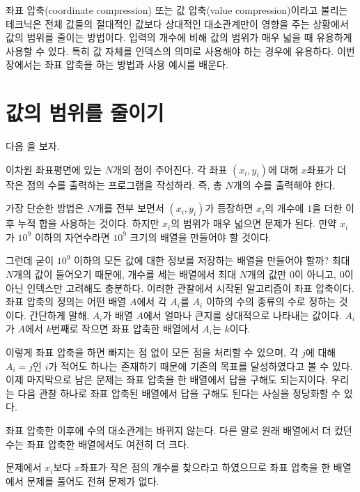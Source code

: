 좌표 압축(coordinate compression) 또는 값 압축(value compression)이라고 불리는 테크닉은 전체 값들의 절대적인 값보다 상대적인 대소관계만이 영향을 주는 상황에서 값의 범위를 줄이는 방법이다. 입력의 개수에 비해 값의 범위가 매우 넓을 때 유용하게 사용할 수 있다. 특히 값 자체를 인덱스의 의미로 사용해야 하는 경우에 유용하다. 이번 장에서는 좌표 압축을 하는 방법과 사용 예시를 배운다.

\section{값의 범위를 줄이기}
다음 을 보자.
\begin{example} \label{ex: value-compression}
    이차원 좌표평면에 있는 $N$개의 점이 주어진다. 각 좌표 $(x_i, y_i)$에 대해 $x$좌표가 더 작은 점의 수를 출력하는 프로그램을 작성하라. 즉, 총 $N$개의 수를 출력해야 한다.
\end{example}

가장 단순한 방법은 $N$개를 전부 보면서 $(x_i, y_i)$가 등장하면 $x_i$의 개수에 $1$을 더한 이후 누적 합을 사용하는 것이다. 하지만 $x_i$의 범위가 매우 넓으면 문제가 된다. 만약 $x_i$가 $10^9$ 이하의 자연수라면 $10^9$ 크기의 배열을 만들어야 할 것이다.

그런데 굳이 $10^9$ 이하의 모든 값에 대한 정보를 저장하는 배열을 만들어야 할까? 최대 $N$개의 값이 들어오기 때문에, 개수를 세는 배열에서 최대 $N$개의 값만 $0$이 아니고, $0$이 아닌 인덱스만 고려해도 충분하다. 이러한 관찰에서 시작된 알고리즘이 좌표 압축이다. 좌표 압축의 정의는 어떤 배열 $A$에서 각 $A_i$를 $A_i$ 이하의 수의 종류의 수로 정하는 것이다. 간단하게 말해, $A_i$가 배열 $A$에서 얼마나 큰지를 상대적으로 나타내는 값이다. $A_i$가 $A$에서 $k$번째로 작으면 좌표 압축한 배열에서 $A_i$는 $k$이다.

이렇게 좌표 압축을 하면 빠지는 점 없이 모든 점을 처리할 수 있으며, 각 $j$에 대해 $A_i=j$인 $i$가 적어도 하나는 존재하기 때문에 기존의 목표를 달성하였다고 볼 수 있다. 이제 마지막으로 남은 문제는 좌표 압축을 한 배열에서 답을 구해도 되는지이다. 우리는 다음 관찰 하나로 좌표 압축된 배열에서 답을 구해도 된다는 사실을 정당화할 수 있다.

\begin{obs}
    좌표 압축한 이후에 수의 대소관계는 바뀌지 않는다. 다른 말로 원래 배열에서 더 컸던 수는 좌표 압축한 배열에서도 여전히 더 크다.
\end{obs}

문제에서 $x_i$보다 $x$좌표가 작은 점의 개수를 찾으라고 하였으므로 좌표 압축을 한 배열에서 문제를 풀어도 전혀 문제가 없다.

